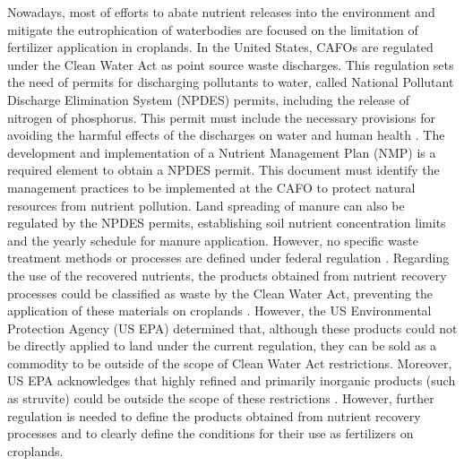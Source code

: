 \begin{refsection}[referencesCh5]
Nowadays, most of efforts to abate nutrient releases into the environment and mitigate the eutrophication of waterbodies are focused on the limitation of fertilizer application in croplands.
In the United States, CAFOs are regulated under the Clean Water Act as point source waste discharges. This regulation sets the need of permits for discharging pollutants to water, called National Pollutant Discharge Elimination System (NPDES) permits, including the release of nitrogen of phosphorus. This permit must include the necessary provisions for avoiding the harmful effects of the discharges on water and human health \citep{NPDE_basics}. The development and implementation of a Nutrient Management Plan (NMP) is a required element to obtain a NPDES permit. This document must identify the management practices to be implemented at the CAFO to protect natural resources from nutrient pollution. Land spreading of manure can also be regulated by the NPDES permits, establishing soil nutrient concentration limits and the yearly schedule for manure application. However, no specific waste treatment methods or processes are defined under federal regulation  \citep{NPDESforCAFO}. Regarding the use of the recovered nutrients, the products obtained from nutrient recovery processes could be classified as waste by the Clean Water Act, preventing the application of these materials on croplands \citep{NACWA503}. However, the US Environmental Protection Agency (US EPA) determined that, although these products could not be directly applied to land under the current regulation, they can be sold as a commodity to be outside of the scope of Clean Water Act restrictions. Moreover, US EPA acknowledges that highly refined and primarily inorganic products (such as struvite) could be outside the scope of these restrictions \citep{CNP503}. However, further regulation is needed to define the products obtained from nutrient recovery processes and to clearly define the conditions for their use as fertilizers on croplands.


\end{refsection}
